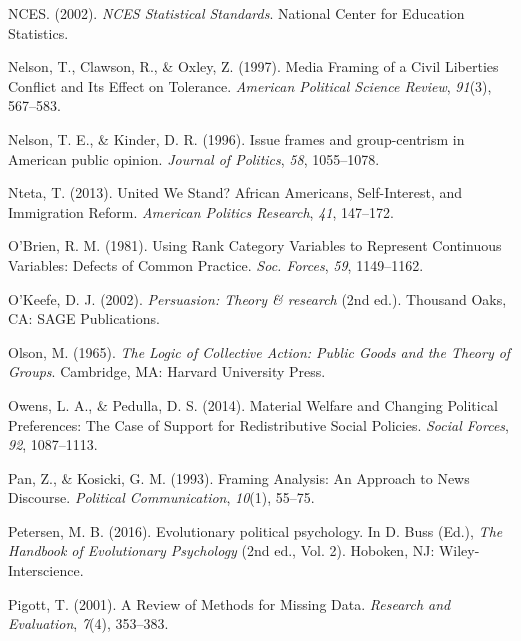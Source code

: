 \documentclass[12pt,econ]{sources/authesis}
\begin{document}
\leavevmode\hypertarget{ref-education-statistics_2002_nces}{}%
NCES. (2002). \emph{NCES Statistical Standards}. National Center for Education Statistics.

\leavevmode\hypertarget{ref-nelson_media_1997}{}%
Nelson, T., Clawson, R., \& Oxley, Z. (1997). Media Framing of a Civil Liberties Conflict and Its Effect on Tolerance. \emph{American Political Science Review}, \emph{91}(3), 567--583.

\leavevmode\hypertarget{ref-nelson_1996_issue}{}%
Nelson, T. E., \& Kinder, D. R. (1996). Issue frames and group-centrism in American public opinion. \emph{Journal of Politics}, \emph{58}, 1055--1078.

\leavevmode\hypertarget{ref-nteta_2013_united}{}%
Nteta, T. (2013). United We Stand? African Americans, Self-Interest, and Immigration Reform. \emph{American Politics Research}, \emph{41}, 147--172.

\leavevmode\hypertarget{ref-obrien_1981_using}{}%
O'Brien, R. M. (1981). Using Rank Category Variables to Represent Continuous Variables: Defects of Common Practice. \emph{Soc. Forces}, \emph{59}, 1149--1162.

\leavevmode\hypertarget{ref-okeefe_2002_persuasion}{}%
O'Keefe, D. J. (2002). \emph{Persuasion: Theory \& research} (2nd ed.). Thousand Oaks, CA: SAGE Publications.

\leavevmode\hypertarget{ref-olson_logic_1965}{}%
Olson, M. (1965). \emph{The Logic of Collective Action: Public Goods and the Theory of Groups}. Cambridge, MA: Harvard University Press.

\leavevmode\hypertarget{ref-owens_2014_material}{}%
Owens, L. A., \& Pedulla, D. S. (2014). Material Welfare and Changing Political Preferences: The Case of Support for Redistributive Social Policies. \emph{Social Forces}, \emph{92}, 1087--1113.

\leavevmode\hypertarget{ref-pan_framing_1993}{}%
Pan, Z., \& Kosicki, G. M. (1993). Framing Analysis: An Approach to News Discourse. \emph{Political Communication}, \emph{10}(1), 55--75.

\leavevmode\hypertarget{ref-petersen_2016_evolutionary}{}%
Petersen, M. B. (2016). Evolutionary political psychology. In D. Buss (Ed.), \emph{The Handbook of Evolutionary Psychology} (2nd ed., Vol. 2). Hoboken, NJ: Wiley-Interscience.

\leavevmode\hypertarget{ref-pigott_review_2001}{}%
Pigott, T. (2001). A Review of Methods for Missing Data. \emph{Research and Evaluation}, \emph{7}(4), 353--383.
\end{document}
